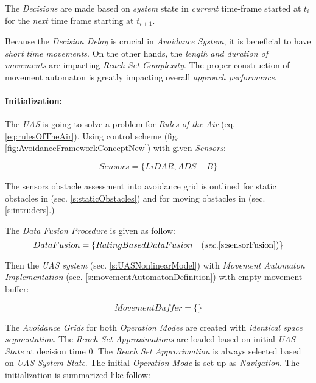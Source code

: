 The \emph{Decisions} are made based on \emph{system} state in \emph{current} time-frame started at $t_i$ for the \emph{next} time frame starting at $t_{i+1}$.

\begin{note}
    Because the \emph{Decision Delay} is crucial in \emph{Avoidance System}, it is beneficial to have \emph{short time movements}. On the other hands, the \emph{length and duration  of movements} are impacting \emph{Reach Set Complexity}. The proper construction of movement automaton is greatly impacting overall \emph{approach performance}.
\end{note}

\paragraph{Initialization:} The \emph{UAS} is going to solve a problem for \emph{Rules of the Air} (eq. \ref{eq:rulesOfTheAir}). Using control scheme (fig. \ref{fig:AvoidanceFrameworkConceptNew}) with given \emph{Sensors}:

\begin{equation}
    Sensors = \{LiDAR,ADS-B\}
\end{equation}

\noindent The sensors obstacle assessment into avoidance grid is outlined for static obstacles in (sec. \ref{s:staticObstacles}) and for moving obstacles in (sec. \ref{s:intruders}.)

\noindent The \emph{Data Fusion Procedure} is given as follow:
\begin{equation}
    DataFusion = \{Rating Based Data Fusion \quad (sec. \ref{s:sensorFusion})\}
\end{equation}

Then the \emph{UAS system} (sec. \ref{s:UASNonlinearModel}) with \emph{Movement Automaton Implementation} (sec. \ref{s:movementAutomatonDefinition}) with empty movement buffer:

\begin{equation}
    Movement Buffer = \{\}
\end{equation}

\noindent The \emph{Avoidance Grids} for both \emph{Operation Modes} are created with \emph{identical space segmentation}. The \emph{Reach Set Approximations} are loaded based on initial \emph{UAS State} at decision time $0$. The \emph{Reach Set Approximation} is always selected based on \emph{UAS System State}. The initial \emph{Operation Mode} is set up as \emph{Navigation}. The initialization is summarized like follow:

